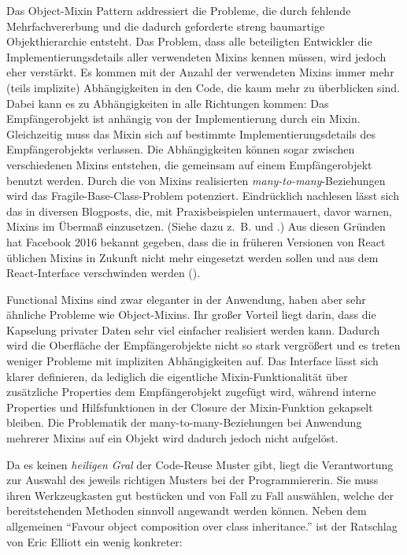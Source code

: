 \skippingparagraph

Das Object-Mixin Pattern addressiert die Probleme, die durch fehlende Mehrfachvererbung und die dadurch geforderte streng baumartige Objekthierarchie entsteht. Das Problem, dass alle beteiligten Entwickler die Implementierungsdetails aller verwendeten Mixins kennen müssen, wird jedoch eher verstärkt. Es kommen mit der Anzahl der verwendeten Mixins immer mehr (teils implizite) Abhängigkeiten in den Code, die kaum mehr zu überblicken sind. Dabei kann es zu Abhängigkeiten in alle Richtungen kommen: Das Empfängerobjekt ist anhängig von der Implementierung durch ein Mixin. Gleichzeitig muss das Mixin sich auf bestimmte Implementierungsdetails des Empfängerobjekts verlassen. Die Abhängigkeiten können sogar zwischen verschiedenen Mixins entstehen, die gemeinsam auf einem Empfängerobjekt benutzt werden. Durch die von Mixins realisierten \emph{many-to-many}-Beziehungen wird das Fragile-Base-Class-Problem potenziert. Eindrücklich nachlesen lässt sich das in diversen Blogposts, die, mit Praxisbeispielen untermauert, davor warnen, Mixins im Übermaß einzusetzen. (Siehe dazu z.~B. \citep{AbramovMixinsAreDead2015a} und \citep{BraithwaiteWhyAreMixins2016}.) Aus diesen Gründen hat Facebook 2016 bekannt gegeben, dass die in früheren Versionen von React üblichen Mixins in Zukunft nicht mehr eingesetzt werden sollen und aus dem React-Interface verschwinden werden (\citep{AbramovMixinsConsideredHarmful2016}).

\skippingparagraph

Functional Mixins sind zwar eleganter in der Anwendung, haben aber sehr ähnliche Probleme wie Object-Mixins. Ihr großer Vorteil liegt darin, dass die Kapselung privater Daten sehr viel einfacher realisiert werden kann. Dadurch wird  die Oberfläche der Empfängerobjekte nicht so stark vergrößert und es treten weniger Probleme mit impliziten Abhängigkeiten auf. Das Interface lässt sich klarer definieren, da lediglich die eigentliche Mixin-Funktionalität über zusätzliche Properties dem Empfängerobjekt zugefügt wird, während interne Properties und Hilfsfunktionen in der Closure der Mixin-Funktion gekapselt bleiben. Die Problematik der many-to-many-Beziehungen bei Anwendung mehrerer Mixins auf ein Objekt wird dadurch jedoch nicht aufgelöst. 

\skippingparagraph

Da es keinen \emph{heiligen Gral} der Code-Reuse Muster gibt, liegt die Verantwortung zur Auswahl des jeweils richtigen Musters bei der Programmiererin. Sie muss ihren Werkzeugkasten gut bestücken und von Fall zu Fall auswählen, welche der bereitstehenden Methoden sinnvoll angewandt werden können. Neben dem allgemeinen "`Favour object composition over class inheritance."' \citep[p. 20]{GoF} ist der Ratschlag von Eric Elliott ein wenig konkreter:

